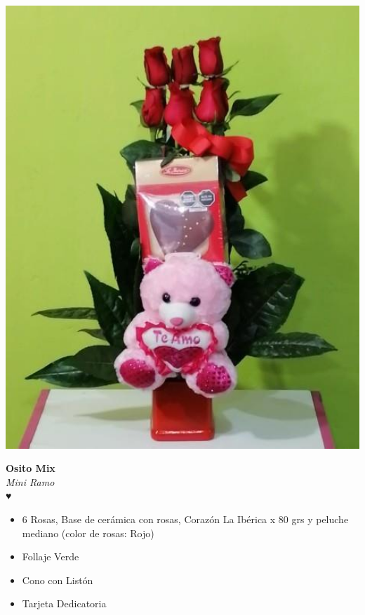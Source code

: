 \documentclass{article}
\begin{document}
\noindent
\begin{minipage}{0.35\textwidth}
    \includegraphics[width=1.0\textwidth]{imagenes_extraidas/image_7_3}
\end{minipage}
\hspace{1cm}
\begin{minipage}{0.6\textwidth}
    \textcolor{cpred}{\textbf{\huge Osito Mix }}\\
    {\textit{Mini Ramo}} \\
    \textcolor{cpred}{\Huge ♥} \\
    \vspace{0.5cm}
    \begin{itemize}
        \item 6 Rosas, Base de cerámica con rosas, Corazón La Ibérica x 80 grs y peluche mediano (color de rosas: Rojo)
        \item Follaje Verde
        \item Cono con Listón
        \item Tarjeta Dedicatoria
    \end{itemize}
\end{minipage}
\end{document}
